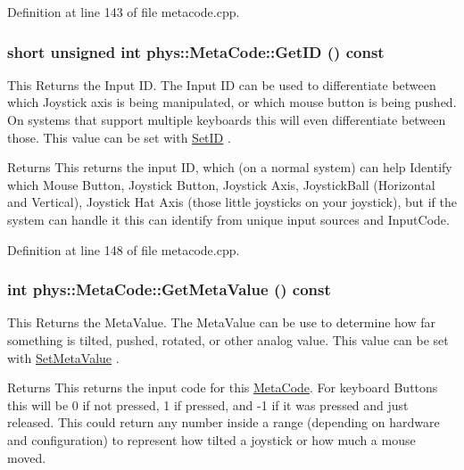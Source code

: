 Definition at line 143 of file metacode.cpp.\hypertarget{classphys_1_1MetaCode_a70389ebd99493248fe93c598e2fe06c9}{
\subsubsection[{GetID}]{\setlength{\rightskip}{0pt plus 5cm}short unsigned int phys::MetaCode::GetID () const}}
\label{da/dc9/classphys_1_1MetaCode_a70389ebd99493248fe93c598e2fe06c9}


This Returns the Input ID. The Input ID can be used to differentiate between which Joystick axis is being manipulated, or which mouse button is being pushed. On systems that support multiple keyboards this will even differentiate between those. This value can be set with \hyperlink{classphys_1_1MetaCode_a0ef70c11c06f0e3015121985cb1b6153}{SetID} . \begin{DoxyReturn}{Returns}
This returns the input ID, which (on a normal system) can help Identify which Mouse Button, Joystick Button, Joystick Axis, JoystickBall (Horizontal and Vertical), Joystick Hat Axis (those little joysticks on your joystick), but if the system can handle it this can identify from unique input sources and InputCode. 
\end{DoxyReturn}


Definition at line 148 of file metacode.cpp.\hypertarget{classphys_1_1MetaCode_ad8e7e4e7c6cdc6a05b8522910ce90cd4}{
\subsubsection[{GetMetaValue}]{\setlength{\rightskip}{0pt plus 5cm}int phys::MetaCode::GetMetaValue () const}}
\label{da/dc9/classphys_1_1MetaCode_ad8e7e4e7c6cdc6a05b8522910ce90cd4}


This Returns the MetaValue. The MetaValue can be use to determine how far something is tilted, pushed, rotated, or other analog value. This value can be set with \hyperlink{classphys_1_1MetaCode_a31a6390626b08c1bbf08e3f68d2ea764}{SetMetaValue} . \begin{DoxyReturn}{Returns}
This returns the input code for this \hyperlink{classphys_1_1MetaCode}{MetaCode}. For keyboard Buttons this will be 0 if not pressed, 1 if pressed, and -\/1 if it was pressed and just released. This could return any number inside a range (depending on hardware and configuration) to represent how tilted a joystick or how much a mouse moved. 
\end{DoxyReturn}


